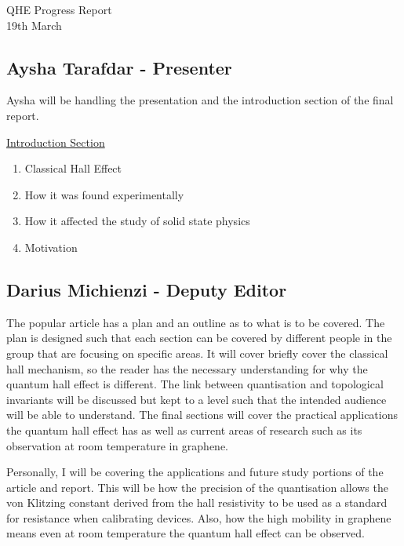 \documentclass[12pt]{article}
\date{}
\newcommand{\PRLsep}{\noindent\makebox[\linewidth]{\resizebox{0.3333\linewidth}{1pt}{$\bullet$}}\bigskip}
\begin{document}
\vspace{-0.95cm}

\begin{center}
    {\Large{QHE Progress Report}}\\
    19th March
\end{center}


\subsection*{Aysha Tarafdar - Presenter}
Aysha will be handling the presentation and the introduction section of the final report.

\underline{Introduction Section}
\begin{enumerate}
    \item Classical Hall Effect
    \item How it was found experimentally
    \item How it affected the study of solid state physics
    \item Motivation
\end{enumerate}

\vspace{0.5cm}
\PRLsep

\subsection*{Darius Michienzi - Deputy Editor}
The popular article has a plan and an outline as to what is to be covered. The plan is designed such that each section can be covered by different people in the
group that are focusing on specific areas. It will cover briefly cover the classical hall mechanism, so the reader has the necessary understanding for why the
quantum hall effect is different. The link between quantisation and topological invariants will be discussed but kept to a level such that the intended audience
will be able to understand. The final sections will cover the practical applications the quantum hall effect has as well as current areas of research such as its
observation at room temperature in graphene.
\newline

Personally, I will be covering the applications and future study portions of the article and report. This will be how the precision of the quantisation allows the
von Klitzing constant derived from the hall resistivity to be used as a standard for resistance when calibrating devices. Also, how the high mobility in graphene
means even at room temperature the quantum hall effect can be observed.
\end{document}
